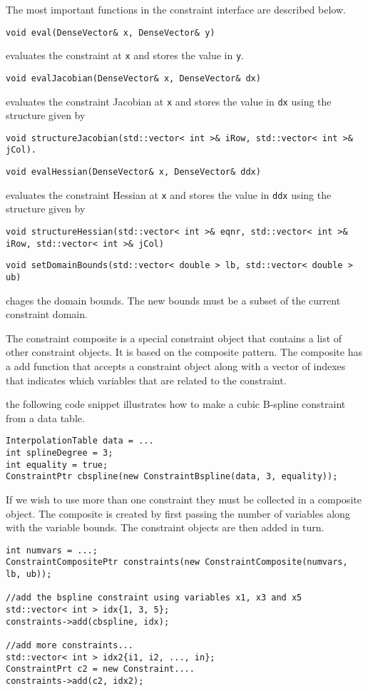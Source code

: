 The most important functions in the constraint interface are described below.
\begin{lstlisting}
void eval(DenseVector& x, DenseVector& y)
\end{lstlisting}
evaluates the constraint at \texttt{x} and stores the value in \texttt{y}.

\begin{lstlisting}
void evalJacobian(DenseVector& x, DenseVector& dx)
\end{lstlisting}
evaluates the constraint Jacobian at \texttt{x} and stores the value in \texttt{dx} using the structure given by
\begin{lstlisting}
void structureJacobian(std::vector< int >& iRow, std::vector< int >& jCol).
\end{lstlisting}

\begin{lstlisting}
void evalHessian(DenseVector& x, DenseVector& ddx)
\end{lstlisting}
evaluates the constraint Hessian at \texttt{x} and stores the value in \texttt{ddx} using the structure given by
\begin{lstlisting}
void structureHessian(std::vector< int >& eqnr, std::vector< int >& iRow, std::vector< int >& jCol)
\end{lstlisting}

\begin{lstlisting}
void setDomainBounds(std::vector< double > lb, std::vector< double > ub)
\end{lstlisting}
chages the domain bounds. The new bounds must be a subset of the current constraint domain.


The constraint composite is a special constraint object that contains a list of other constraint objects. It is based on the composite pattern. The composite has a add function that accepts a constraint object along with a vector of indexes that indicates which variables that are related to the constraint. 

the following code snippet illustrates how to make a cubic B-spline constraint from a data table.
\begin{lstlisting}
InterpolationTable data = ...
int splineDegree = 3;
int equality = true;
ConstraintPtr cbspline(new ConstraintBspline(data, 3, equality));
\end{lstlisting}

If we wish to use more than one constraint they must be collected in a composite object. The composite is created by first passing the number of variables along with the variable bounds. The constraint objects are then added in turn.
\begin{lstlisting}
int numvars = ...;
ConstraintCompositePtr constraints(new ConstraintComposite(numvars, lb, ub));

//add the bspline constraint using variables x1, x3 and x5
std::vector< int > idx{1, 3, 5};
constraints->add(cbspline, idx);

//add more constraints...
std::vector< int > idx2{i1, i2, ..., in};
ConstraintPrt c2 = new Constraint....
constraints->add(c2, idx2);
\end{lstlisting}

